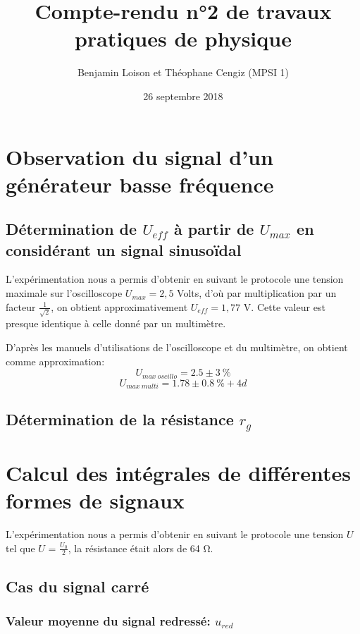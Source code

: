\documentclass{article}
\begin{document}
\title{Compte-rendu n°2 de travaux pratiques de physique}
\author{Benjamin Loison et Théophane Cengiz (MPSI 1)}
\date{26 septembre 2018}
\maketitle

\section{Observation du signal d'un générateur basse fréquence}

\subsection{Détermination de $U_{eff}$ à partir de $U_{max}$ en considérant un signal sinusoïdal}

L'expérimentation nous a permis d'obtenir en suivant le protocole une tension maximale sur l'oscilloscope $U_{max}=2,5$ Volts, d'où par multiplication par un facteur $\frac{1}{\sqrt2}$, on obtient approximativement $U_{eff}=1,77$ V. Cette valeur est presque identique à celle donné par un multimètre.

D'après les manuels d'utilisations de l'oscilloscope et du multimètre, on obtient comme approximation: \[ U_{max\ oscillo}=2.5 \pm 3\ \% \]
\[ U_{max\ multi}=1.78 \pm 0.8\ \% + 4d \]

\subsection{Détermination de la résistance $r_g$}

\section{Calcul des intégrales de différentes formes de signaux}

L'expérimentation nous a permis d'obtenir en suivant le protocole une tension $U$ tel que $U$ = $\frac{U_0}{2}$, la résistance était alors de 64 \si{\ohm}.

\subsection{Cas du signal carré}

\subsubsection{Valeur moyenne du signal redressé: $u_{red}$}
\end{document}
